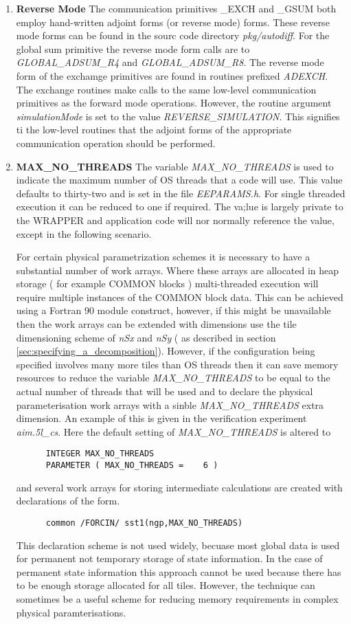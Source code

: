\begin{enumerate}
\item {\bf Reverse Mode}
The communication primitives \_EXCH and \_GSUM both employ 
hand-written adjoint forms (or reverse mode) forms. 
These reverse mode forms can be found in the
sourc code directory {\em pkg/autodiff}.
For the global sum primitive the reverse mode form
calls are to {\em GLOBAL\_ADSUM\_R4} and
{\em GLOBAL\_ADSUM\_R8}. The reverse mode form of the
exchamge primitives are found in routines
prefixed {\em ADEXCH}. The exchange routines make calls to
the same low-level communication primitives as the forward mode
operations. However, the routine argument {\em simulationMode}
is set to the value {\em REVERSE\_SIMULATION}. This signifies 
ti the low-level routines that the adjoint forms of the
appropriate communication operation should be performed.
\item {\bf MAX\_NO\_THREADS}
The variable {\em MAX\_NO\_THREADS} is used to indicate the
maximum number of OS threads that a code will use. This
value defaults to thirty-two and is set in the file {\em EEPARAMS.h}.
For single threaded execution it can be reduced to one if required.
The va;lue is largely private to the WRAPPER and application code
will nor normally reference the value, except in the following scenario.

For certain physical parametrization schemes it is necessary to have 
a substantial number of work arrays. Where these arrays are allocated
in heap storage ( for example COMMON blocks ) multi-threaded
execution will require multiple instances of the COMMON block data.
This can be achieved using a Fortran 90 module construct, however,
if this might be unavailable then the work arrays can be extended
with dimensions use the tile dimensioning scheme of {\em nSx}
and {\em nSy} ( as described in section 
\ref{sec:specifying_a_decomposition}). However, if the configuration
being specified involves many more tiles than OS threads then
it can save memory resources to reduce the variable
{\em MAX\_NO\_THREADS} to be equal to the actual number of threads that
will be used and to declare the physical parameterisation
work arrays with a sinble {\em MAX\_NO\_THREADS} extra dimension.
An example of this is given in the verification experiment
{\em aim.5l\_cs}. Here the default setting of 
{\em MAX\_NO\_THREADS} is altered to
\begin{verbatim}
      INTEGER MAX_NO_THREADS
      PARAMETER ( MAX_NO_THREADS =    6 )
\end{verbatim}
and several work arrays for storing intermediate calculations are
created with declarations of the form.
\begin{verbatim}
      common /FORCIN/ sst1(ngp,MAX_NO_THREADS)
\end{verbatim}
This declaration scheme is not used widely, becuase most global data
is used for permanent not temporary storage of state information.
In the case of permanent state information this approach cannot be used
because there has to be enough storage allocated for all tiles.
However, the technique can sometimes be a useful scheme for reducing memory 
requirements in complex physical paramterisations.
\end{enumerate}

